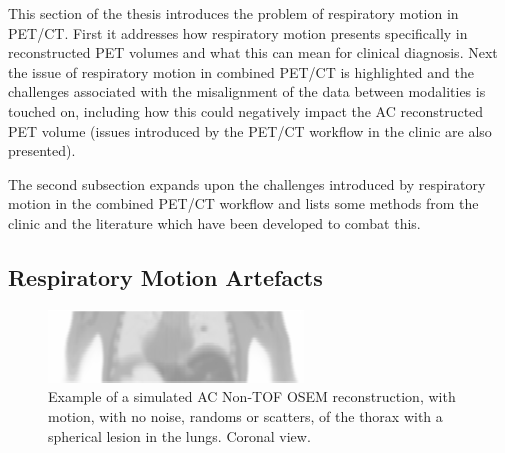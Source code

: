         This section of the thesis introduces the problem of respiratory motion in \gls{PET}/\gls{CT}. First it addresses how respiratory motion presents specifically in reconstructed \gls{PET} volumes and what this can mean for clinical diagnosis. Next the issue of respiratory motion in combined \gls{PET}/\gls{CT} is highlighted and the challenges associated with the misalignment of the data between modalities is touched on, including how this could negatively impact the \gls{AC} reconstructed \gls{PET} volume (issues introduced by the \gls{PET}/\gls{CT} workflow in the clinic are also presented).
            
        The second subsection expands upon the challenges introduced by respiratory motion in the combined \gls{PET}/\gls{CT} workflow and lists some methods from the clinic and the literature which have been developed to combat this.
        
        \subsection{Respiratory Motion Artefacts} \label{sec:respiratory_motion_artefacts}
            
            \begin{figure}
                \centering
                
                \includegraphics[width=1.0\linewidth]{figures/background_motion_artefact_example.png}
                
                \captionsetup{singlelinecheck=false, justification=raggedright}
                \caption{Example of a simulated \gls{AC} \gls{Non-TOF} \gls{OSEM} reconstruction, with motion, with no noise, randoms or scatters, of the thorax with a spherical lesion in the lungs. Coronal view.}
                \label{fig:respiratory_motion_artefacts_motion_artefact}
            \end{figure}
            
